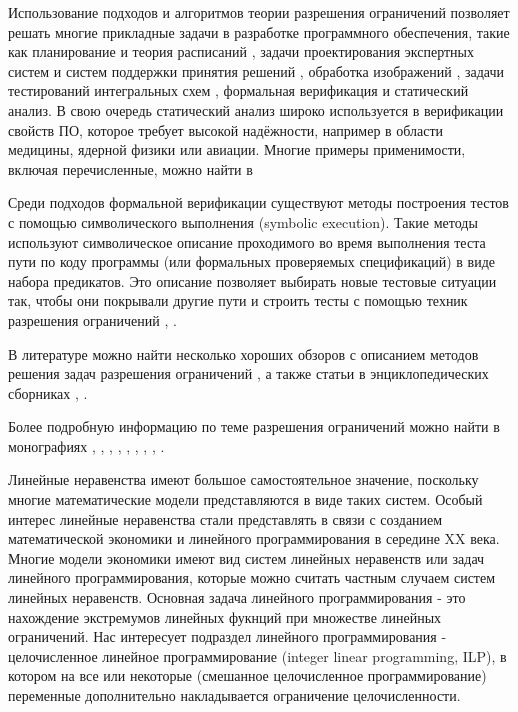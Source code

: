 \documentclass[a4paper,14pt,russian]{extreport}
\begin{document}
\par
Использование подходов и алгоритмов теории разрешения ограничений позволяет решать многие прикладные задачи в разработке программного обеспечения, такие как планирование \cite{kautz} и теория расписаний \cite{barnier}, задачи проектирования экспертных систем и систем поддержки принятия решений \cite{saraev}, обработка изображений \cite{montanari}, задачи тестирований интегральных схем \cite{hooker}, формальная верификация и статический анализ. В свою очередь статический анализ широко используется в верификации свойств ПО, которое требует высокой надёжности, например в области медицины, ядерной физики или авиации. Многие примеры применимости, включая перечисленные, можно найти в \cite{heipcke}
\par
Среди подходов формальной верификации существуют методы построения тестов с помощью символического выполнения (symbolic execution). Такие методы используют символическое описание проходимого во время выполнения теста пути по коду программы (или формальных проверяемых спецификаций) в виде набора предикатов. Это описание позволяет выбирать новые тестовые ситуации так, чтобы они покрывали другие пути и строить тесты с помощью техник разрешения ограничений \cite{gotlieb}, \cite{boyapati}. 
\par 
В литературе можно найти несколько хороших обзоров с описанием методов решения задач разрешения ограничений \cite{kumar} \cite{dechter_frost} \cite{bartak} \cite{meseguer} \cite{miguel}, а также статьи в энциклопедических сборниках  \cite{dechter_networks}, \cite{hower} \cite{mackworth}.
\par 
Более подробную информацию по теме разрешения ограничений можно найти в монографиях \cite{apt}, \cite{dechter}, \cite{fruehwirth}, \cite{marriott}, \cite{rossi}, \cite{hentenryck}, \cite{hentenryck_michel_deville}, \cite{hentenryck_opl}, \cite{hentenryck_michel}. 
\par 
Линейные неравенства имеют большое самостоятельное значение, поскольку многие математические модели представляются в виде таких систем. Особый интерес линейные неравенства стали представлять в связи с созданием математической экономики \cite{kantorovich} и линейного программирования в середине XX века. Многие модели экономики имеют вид систем линейных неравенств или задач линейного программирования, которые можно считать частным случаем систем линейных неравенств. Основная задача линейного программирования - это нахождение экстремумов линейных фукнций при множестве линейных ограничений. Нас интересует подраздел линейного программирования - целочисленное линейное программирование (integer linear programming, ILP), в котором на все или некоторые (смешанное целочисленное программирование) переменные дополнительно накладывается ограничение целочисленности. 
\par
\end{document}
